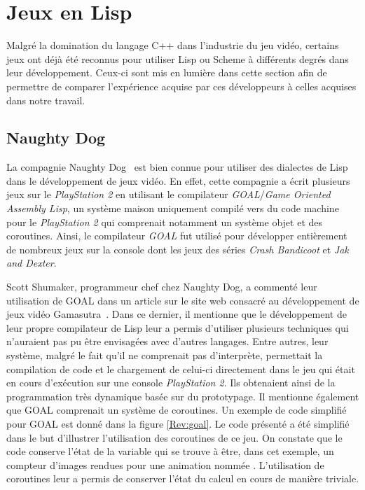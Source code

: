 \documentclass[12pt,twoside,letterpaper,francais]{book}
\newcommand{\scheme}[1]{\selectlanguage{english}{\tt #1}\selectlanguage{french}}
\begin{document}
\FloatBarrier
\section{Jeux en Lisp}
Malgré la domination du langage C++ dans l'industrie du jeu vidéo,
certains jeux ont déjà été reconnus pour utiliser Lisp ou Scheme à
différents degrés dans leur dévelop\-pement. Ceux-ci sont mis en
lumière dans cette section afin de permettre de comparer l'expérience
acquise par ces développeurs à celles acquises dans notre travail.


\FloatBarrier
\subsection{Naughty Dog}
La compagnie Naughty Dog~\cite{ND} est bien connue pour utiliser des
dialectes de Lisp dans le dévelop\-pement de jeux vidéo. En effet,
cette compagnie a écrit plusieurs jeux sur le \textit{PlayStation 2}
en utilisant le compilateur \textit{GOAL}/\textit{Game Oriented
  Assembly Lisp}, un système maison uniquement compilé vers du code
machine pour le \textit{PlayStation 2} qui comprenait notamment un
système objet et des coroutines. Ainsi, le compilateur \textit{GOAL}
fut utilisé pour développer entièrement de nombreux jeux sur la
console dont les jeux des séries \textit{Crash Bandicoot} et
\textit{Jak and Dexter}.

Scott Shumaker, programmeur chef chez Naughty Dog, a commenté leur
utilisation de GOAL dans un article sur le site web consacré au
dévelop\-pement de jeux vidéo Gamasutra~\cite{ND_GOAL}. Dans ce
dernier, il mentionne que le dévelop\-pement de leur propre
compilateur de Lisp leur a permis d'utiliser plusieurs techniques qui
n'auraient pas pu être envisagées avec d'autres langages. Entre
autres, leur système, malgré le fait qu'il ne comprenait pas
d'interprète, permettait la compilation de code et le chargement de
celui-ci directement dans le jeu qui était en cours d'exécution sur
une console \textit{PlayStation 2}. Ils obtenaient ainsi de la
programmation très dynamique basée sur du prototypage. Il mentionne
également que GOAL comprenait un système de coroutines. Un exemple de
code simplifié pour GOAL est donné dans la figure \ref{Rev:goal}. Le
code présenté a été simplifié dans le but d'illustrer l'utilisation
des coroutines de ce jeu. On constate que le code conserve l'état de
la variable \scheme{ii} qui se trouve à être, dans cet exemple, un
compteur d'images rendues pour une animation nommée
\scheme{idle}. L'utilisation de coroutines leur a permis de conserver
l'état du calcul en cours de manière triviale.\\
\end{document}
